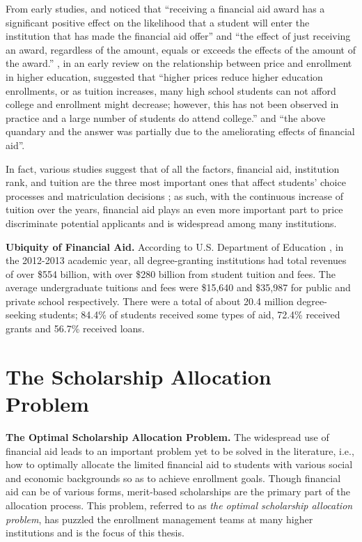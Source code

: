\documentclass[12pt,english]{report}
\begin{document}
From early studies, \citet{Heller1997} and \citet{Leslie1988} noticed that 
``receiving a financial aid award has a significant positive effect on the 
likelihood that a student will enter the institution that has made the 
financial aid offer'' and ``the effect of just receiving an award, regardless 
of the amount, equals or exceeds the effects of the amount of the award.'' 
\citet{Leslie1987}, in an early review on the relationship between price and 
enrollment in higher education, suggested that ``higher prices reduce higher 
education enrollments, or as tuition increases, many high school students can 
not afford college and enrollment might decrease; however, this has not been 
observed in practice and a large number of students do attend college.'' and 
``the above quandary and the answer was partially due to the ameliorating 
effects of financial aid''.

In fact, various studies suggest that of all the factors, financial aid, institution rank, and tuition are the three most important ones that affect students' choice processes and matriculation decisions \citep{Fulleri2014}; as such, with the continuous increase of tuition over the years, financial aid plays an even more important part to price discriminate potential applicants and is widespread among many institutions.  

\noindent \textbf{Ubiquity of Financial Aid.} According to U.S. Department of  Education \citep{DOE2014}, in the 2012-2013 academic year, all degree-granting institutions had total revenues of over \$554 billion, with over \$280 billion from student tuition and fees. The average undergraduate tuitions and fees were \$15,640 and \$35,987 for public and private school respectively. There were a total of about 20.4 million degree-seeking students;  84.4\% of students received some types of aid, 72.4\% received grants and 56.7\% received loans.

\section{The Scholarship Allocation Problem} 
\noindent \textbf{The Optimal Scholarship Allocation Problem.} The widespread use of financial aid leads to an important problem yet to be solved in the literature, i.e., how to optimally allocate the limited financial aid to students with various social and economic backgrounds so as to achieve enrollment goals. Though financial aid can be of various forms, merit-based scholarships are the primary part of the allocation process. This problem, referred to as \textit{the optimal scholarship allocation problem}, has puzzled the enrollment management teams at many higher institutions and is the focus of this thesis.
\end{document}
